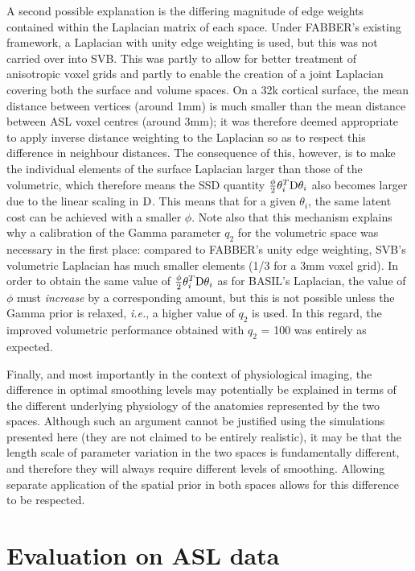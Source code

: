 A second possible explanation is the differing magnitude of edge weights contained within the Laplacian matrix of each space. Under FABBER's existing framework, a Laplacian with unity edge weighting is used, but this was not carried over into SVB. This was partly to allow for better treatment of anisotropic voxel grids and partly to enable the creation of a joint Laplacian covering both the surface and volume spaces. On a 32k cortical surface, the mean distance between vertices (around 1mm) is much smaller than the mean distance between ASL voxel centres (around 3mm); it was therefore deemed appropriate to apply inverse distance weighting to the Laplacian so as to respect this difference in neighbour distances. The consequence of this, however, is to make the individual elements of the surface Laplacian larger than those of the volumetric, which therefore means the SSD quantity $\frac{\phi}{2}\theta_i^T\mathrm{D}\theta_i$ also becomes larger due to the linear scaling in $\mathrm{D}$. This means that for a given $\theta_i$, the same latent cost can be achieved with a smaller $\phi$. Note also that this mechanism explains why a calibration of the Gamma parameter $q_2$ for the volumetric space was necessary in the first place: compared to FABBER's unity edge weighting, SVB's volumetric Laplacian has much smaller elements (1/3 for a 3mm voxel grid). In order to obtain the same value of $\frac{\phi}{2}\theta_i^T\mathrm{D}\theta_i$ as for BASIL's Laplacian, the value of $\phi$ must \textit{increase} by a corresponding amount, but this is not possible unless the Gamma prior is relaxed, \textit{i.e.}, a higher value of $q_2$ is used. In this regard, the improved volumetric performance obtained with $q_2$ = 100 was entirely as expected. 

Finally, and most importantly in the context of physiological imaging, the difference in optimal smoothing levels may potentially be explained in terms of the different underlying physiology of the anatomies represented by the two spaces. Although such an argument cannot be justified using the simulations presented here (they are not claimed to be entirely realistic), it may be that the length scale of parameter variation in the two spaces is fundamentally different, and therefore they will always require different levels of smoothing. Allowing separate application of the spatial prior in both spaces allows for this difference to be respected. 

\section{Evaluation on ASL data}

